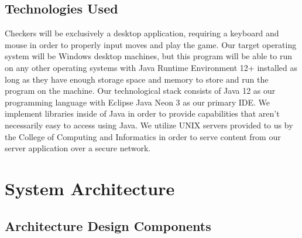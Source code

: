 \documentclass{scrreprt}
\begin{document}
	\section{Technologies Used}
	Checkers will be exclusively a desktop application, requiring a keyboard and mouse in order to properly input moves and play the game. Our target operating system will be Windows desktop machines, but this program will be able to run on any other operating systems  with Java Runtime Environment 12+ installed as long as they have enough storage space and memory to store and run the program on the machine. 
	Our technological stack consists of Java 12 as our programming language with Eclipse Java Neon 3 as our primary IDE. We implement libraries inside of Java in order to provide capabilities that aren't necessarily easy to access using Java. We utilize UNIX servers provided to us by the College of Computing and Informatics in order to serve content from our server application over a secure network. 

\chapter{System Architecture}
	\section{Architecture Design Components}
\end{document}

